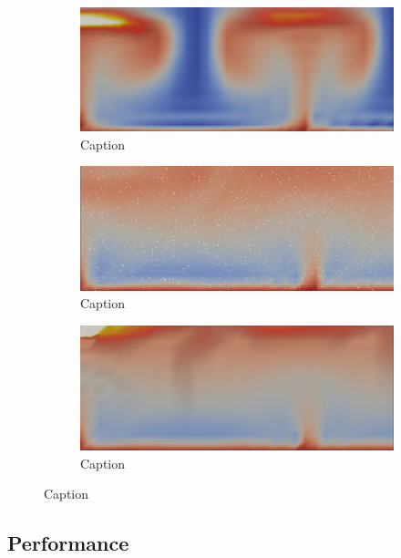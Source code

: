 \begin{figure}
\begin{subfigure}{0.49\textwidth}
        \centering
        \includegraphics[width=\textwidth]{figures/box_2pp38.png}
        \caption{Caption}
        \label{fig:my_label}
    \end{subfigure}
    \begin{subfigure}{0.49\textwidth}
        \centering
        \includegraphics[width=\textwidth]{figures/box_batch79.png}
        \caption{Caption}
        \label{fig:my_label}
    \end{subfigure}
    \hfill
    \begin{subfigure}{0.49\textwidth}
        \centering
        \includegraphics[width=\textwidth]{figures/box_2pp77.png}
        \caption{Caption}
        \label{fig:my_label}
    \end{subfigure}
\end{figure}

\subsection{Performance}

